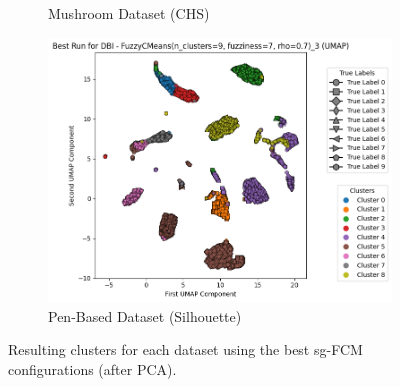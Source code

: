 \begin{figure}[H]
\begin{subfigure}{0.32\textwidth}
		\caption{Mushroom Dataset (CHS)}
	\end{subfigure}
	\hfill
	\begin{subfigure}{0.32\textwidth}
		\centering
		\includegraphics[width=\linewidth]{figures/FuzzyCMeans/PenBased/best_run_DBI.png}
		\caption{Pen-Based Dataset (Silhouette)}
	\end{subfigure}
	\caption{Resulting clusters for each dataset using the best sg-FCM configurations (after PCA).}
	\label{fig:sgfcm:clusters}
\end{figure}
